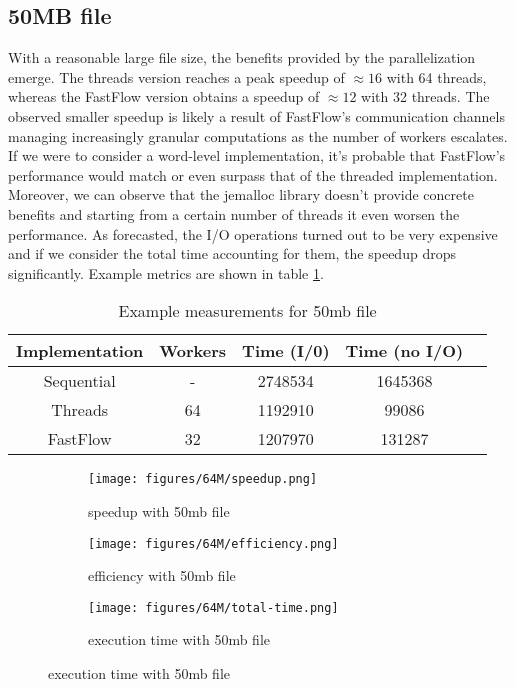 \documentclass{article}
\begin{document}
\subsection{50MB file}
With a reasonable large file size, the benefits provided by the parallelization emerge.
The threads version reaches a peak speedup of $\approx 16$ with 64 threads,
whereas the FastFlow version obtains a speedup of $\approx 12$ with 32 threads.
The observed smaller speedup is likely a result of FastFlow's communication channels managing
increasingly granular computations as the number of workers escalates.
If we were to consider a word-level implementation,
it's probable that FastFlow's performance would match or even surpass that of the threaded implementation.
Moreover, we can observe that the jemalloc library doesn't provide concrete benefits
and starting from a certain number of threads it even worsen the performance.
As forecasted, the I/O operations turned out to be very expensive and if
we consider the total time accounting for them, the speedup drops significantly.
Example metrics are shown in table \ref{tab:measurements}.
\begin{table}[H]
    \centering
    \begin{tabular}{|c|c|c|c|c|}
        \hline
        Implementation & Workers & Time (I/0) & Time (no I/O) \\
        \hline
        Sequential     & -       & 2748534    & 1645368       \\
        Threads        & 64      & 1192910    & 99086         \\
        FastFlow       & 32      & 1207970    & 131287        \\
        \hline
    \end{tabular}
    \caption{Example measurements for 50mb file}
    \label{tab:measurements}
\end{table}

\begin{figure}[H]
    \begin{subfigure}{0.5\textwidth}
        \centering
        \texttt{[image: figures/64M/speedup.png]}
        \caption{speedup with 50mb file}
    \end{subfigure}
    \begin{subfigure}{0.5\textwidth}
        \centering
        \texttt{[image: figures/64M/efficiency.png]}
        \caption{efficiency with 50mb file}
    \end{subfigure}
    \begin{subfigure}{0.5\textwidth}
        \centering
        \texttt{[image: figures/64M/total-time.png]}
        \caption{execution time with 50mb file}
    \end{subfigure}
\end{figure}
\end{document}
